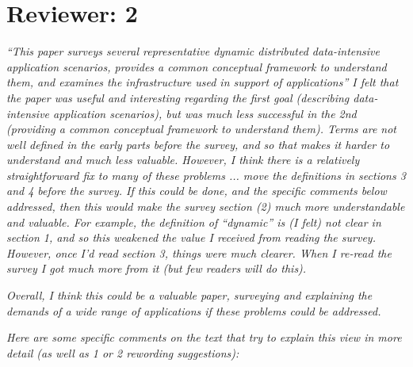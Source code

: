 \documentclass{article}
\begin{document}
\section{Reviewer: 2}


\emph{``This paper surveys several representative dynamic distributed data-intensive application scenarios, provides a common conceptual framework to understand them, and examines the infrastructure used in support of applications'' I felt that the paper was useful and interesting regarding the first goal (describing data-intensive application scenarios), but was much less successful in the 2nd (providing a common conceptual framework to understand them). Terms are not well defined in the early parts before the survey, and so that makes it harder to understand and much less valuable. However, I think there is a relatively straightforward fix to many of these problems ... move the definitions in sections 3 and 4 before the survey. If this could be done, and the specific comments below addressed, then this would make the survey section (2) much more understandable and valuable. For example, the definition of ``dynamic'' is (I felt) not clear in section 1, and so this weakened the value I received from reading the survey. However, once I'd read section 3, things were much clearer. When I re-read the survey I got much more from it (but few readers will do this).}

\emph{Overall, I think this could be a valuable paper, surveying and explaining the demands of a wide range of applications if these problems could be addressed.}

\emph{Here are some specific comments on the text that try to explain this view in more detail (as well as 1 or 2 rewording suggestions):}
 
\end{document}
